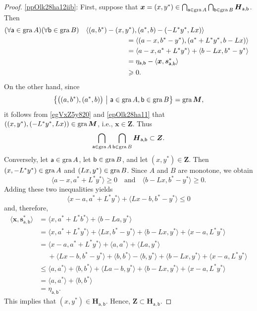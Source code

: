 \documentclass[a4paper,11pt,fleqn]{article}
\renewcommand{\leq}{\ensuremath{\leqslant}}
\renewcommand{\geq}{\ensuremath{\geqslant}}
\newcommand{\pair}[2]{\langle{{#1},{#2}}\rangle}
\newcommand{\menge}[2]{\big\{{#1}~\big |~{#2}\big\}}
\newcommand{\gra}{\ensuremath{\text{\rm gra}\,}}
\theoremstyle{plain}{\theorembodyfont{\rmfamily}%
\newtheorem{conjecture}[theorem]{Conjecture}}
\theoremstyle{plain}{\theorembodyfont{\rmfamily}%
\newtheorem{example}[theorem]{Example}}
\theoremstyle{plain}{\theorembodyfont{\rmfamily}%
\newtheorem{remark}[theorem]{Remark}}
\theoremstyle{plain}{\theorembodyfont{\rmfamily}%
\newtheorem{algorithm}[theorem]{Algorithm}}
\theoremstyle{plain}{\theorembodyfont{\rmfamily}%
\newtheorem{condition}[theorem]{Condition}}
\theoremstyle{plain}{\theorembodyfont{\rmfamily}%
\newtheorem{definition}[theorem]{Definition}}
\theoremstyle{plain}{\theorembodyfont{\rmfamily}
\newtheorem{problem}[theorem]{Problem}}
\theoremstyle{plain}{\theorembodyfont{\rmfamily}
\newtheorem{notation}[theorem]{Notation}}
\numberwithin{equation}{section}
\begin{document}
\begin{proof}
\ref{ppOlk28ha12iib}: First, suppose that
$\boldsymbol{x}=(x,y^*)\in\bigcap_{\mathsf{a}\in\gra A}
\bigcap_{\mathsf{b}\in\gra B}
\boldsymbol{H}_{\mathsf{a},\mathsf{b}}$. Then 
\begin{align}
\label{epOlk28ha11}
&\hskip -2mm
(\forall\mathsf{a}\in\gra A)(\forall\mathsf{b}\in\gra B)\quad
\pair{(a,b^*)-(x,y^*)}{(a^*,b)-(-L^*y^*,Lx)}\nonumber\\
&\hskip 60mm =\pair{(a-x,b^*-y^*)}{(a^*+L^*y^*,b-Lx)}\nonumber\\
&\hskip 60mm =\pair{a-x}{a^*+L^*y^*}+\pair{b-Lx}{b^*-y^*}\nonumber\\
&\hskip 60mm =\eta_{\mathsf{a},\mathsf{b}}-\pair{\boldsymbol{x}}
{\boldsymbol{s}^*_{\mathsf{a},\mathsf{b}}}\nonumber\\
&\hskip 60mm \geq 0.
\end{align}
On the other hand, since 
\begin{equation}
\label{epOlk28ha18x}
\menge{\big((a,b^*),(a^*,b)\big)}{\mathsf{a}\in\gra A, 
\mathsf{b}\in\gra B}=\gra\boldsymbol{M}, 
\end{equation}
it follows from \eqref{egVxZ5y820} and \eqref{epOlk28ha11} that
$((x,y^*),(-L^*y^*,Lx))\in\gra\boldsymbol{M}$, i.e., 
$\boldsymbol{x}\in\boldsymbol{Z}$. Thus 
\begin{equation}
\label{epOlk28ha19}
\bigcap_{\mathsf{a}\in\gra A}\bigcap_{\mathsf{b}\in\gra B}
\boldsymbol{H}_{\mathsf{a},\mathsf{b}}\subset\boldsymbol{Z}.
\end{equation}
Conversely, let $\mathsf{a}\in\gra A$, let $\mathsf{b}\in\gra B$,
and let $(x,y^*)\in\boldsymbol{Z}$. 
Then $(x,-L^*y^*)\in\gra A$ and $(Lx,y^*)\in\gra B$. Since
$A$ and $B$ are monotone, we obtain
\begin{equation}
\pair{a-x}{a^*+L^*y^*}\geq 0
\quad\text{and}\quad
\pair{b-Lx}{b^*-y^*}\geq 0.
\end{equation}
Adding these two inequalities yields
\begin{equation}
\pair{x-a}{a^*+L^*y^*}+\pair{Lx-b}{b^*-y^*}\leq 0
\end{equation}
and, therefore,
\begin{align}
\label{epOlk28ha18}
\pair{\boldsymbol{x}}{\boldsymbol{s}^*_{\mathsf{a},\mathsf{b}}}
&=\pair{x}{a^*+L^*b^*}+\pair{b-La}{y^*}\nonumber\\
&=\pair{x}{a^*+L^*y^*}+\pair{Lx}{b^*-y^*}
+\pair{b-Lx}{y^*}+\pair{x-a}{L^*y^*}\nonumber\\
&=\pair{x-a}{a^*+L^*y^*}+\pair{a}{a^*}+\pair{La}{y^*}\nonumber\\
&\quad\;+\pair{Lx-b}{b^*-y^*}+\pair{b}{b^*}-\pair{b}{y^*}
+\pair{b-Lx}{y^*}+\pair{x-a}{L^*y^*}\nonumber\\
&\leq\pair{a}{a^*}+\pair{b}{b^*}+\pair{La-b}{y^*}
+\pair{b-Lx}{y^*}+\pair{x-a}{L^*y^*}\nonumber\\
&=\pair{a}{a^*}+\pair{b}{b^*}\nonumber\\
&=\eta_{\mathsf{a},\mathsf{b}}.
\end{align}
This implies that 
$(x,y^*)\in\boldsymbol{H}_{\mathsf{a},\mathsf{b}}$. Hence, 
$\boldsymbol{Z}\subset\boldsymbol{H}_{\mathsf{a},\mathsf{b}}$. 


\end{proof}
\end{document}
